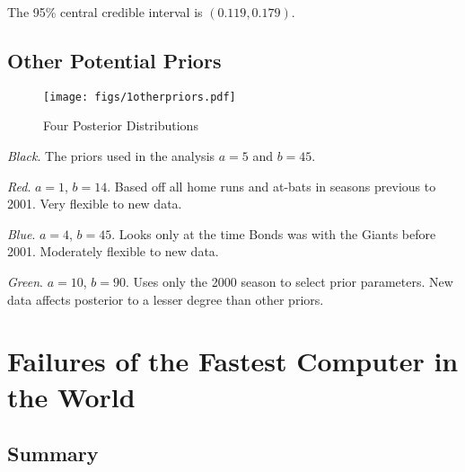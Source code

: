 \documentclass[12pt]{article}
\begin{document}
\noindent The 95\% central credible interval is $(0.119, 0.179)$.

\subsection{Other Potential Priors}


\begin{figure}[H]
\begin{center}
\texttt{[image: figs/1otherpriors.pdf]}
\caption{Four Posterior Distributions}
\end{center}
\end{figure}

\noindent \emph{Black}.  The priors used in the analysis $a=5$ and $b=45$.

\noindent \emph{Red}. $a=1$, $b=14$.  Based off all home runs and at-bats in seasons previous to 2001.  Very flexible to new data.

\noindent \emph{Blue}. $a=4$, $b=45$.  Looks only at the time Bonds was with the Giants before 2001.  Moderately flexible to new data.

\noindent \emph{Green}. $a=10$, $b=90$.  Uses only the 2000 season to select prior parameters.  New data affects posterior to a lesser degree than other priors.

%

\newpage

\section{Failures of the Fastest Computer in the World}

\subsection{Summary}
\end{document}
